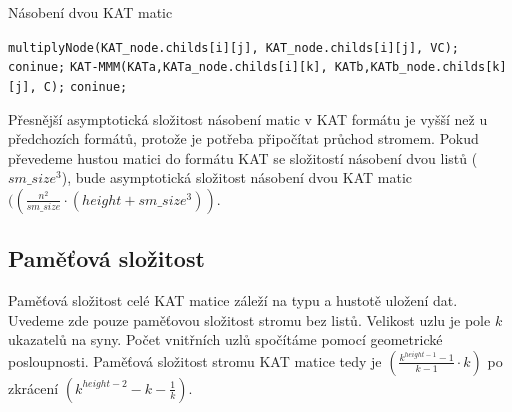 \label{alg:kat-mmm}
\begin{algorithm}[htb]
	\caption{Násobení dvou KAT matic}\label{kat-mmm}
	\begin{algorithmic}[1]
							\State \texttt{multiplyNode(KAT\_node.childs[i][j], KAT\_node.childs[i][j], VC);}
							\State \texttt{coninue;}
						\EndIf
							\State \texttt{KAT-MMM(KATa,KATa\_node.childs[i][k], KATb,KATb\_node.childs[k][j], C);}
							\State \texttt{coninue;}
						\EndIf
					\EndIf
				\EndFor
			\EndFor
		\EndFor
		\EndProcedure
	\end{algorithmic}
\end{algorithm}

Přesnější asymptotická složitost násobení matic v KAT formátu je vyšší než u předchozích formátů, protože je potřeba připočítat průchod stromem. Pokud převedeme hustou matici do formátu KAT se složitostí násobení dvou listů \bigO($sm\_size^3$), bude asymptotická složitost násobení dvou KAT matic \bigO$((\frac{n^2}{sm\_size} \cdot (height+sm\_size^3))$.

\subsection{Paměťová složitost}

Paměťová složitost celé KAT matice záleží na typu a hustotě uložení dat. Uvedeme zde pouze paměťovou složitost stromu bez listů. Velikost uzlu je pole $k$ ukazatelů na syny. Počet vnitřních uzlů spočítáme pomocí geometrické posloupnosti. Paměťová složitost stromu KAT matice tedy je \bigO$(\frac{k^{height-1}-1}{k - 1} \cdot k)$ po zkrácení \bigO$(k^{height-2}-k-\frac{1}{k})$.